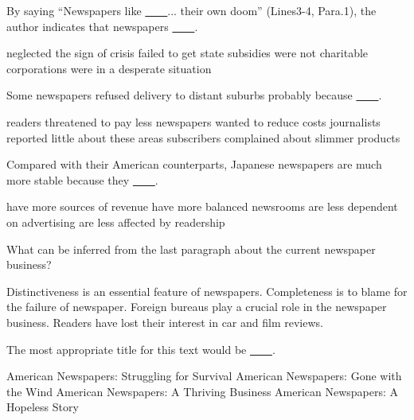 \item By saying ``Newspapers like \uline{~~~~}... their own doom'' (Lines3-4, Para.1), the author indicates that newspapers \uline{~~~~}.
\begin{tasks}
	\task neglected the sign of crisis
	\task failed to get state subsidies
	\task were not charitable corporations
	\task were in a desperate situation
\end{tasks}
\item Some newspapers refused delivery to distant suburbs probably because \uline{~~~~}.
\begin{tasks}
	\task readers threatened to pay less
	\task newspapers wanted to reduce costs
	\task journalists reported little about these areas
	\task subscribers complained about slimmer products
\end{tasks}
\item Compared with their American counterparts, Japanese newspapers are much more stable because they \uline{~~~~}.
\begin{tasks}
	\task have more sources of revenue
	\task have more balanced newsrooms
	\task are less dependent on advertising
	\task are less affected by readership
\end{tasks}
\item What can be inferred from the last paragraph about the current newspaper business?
\begin{tasks}
	\task Distinctiveness is an essential feature of newspapers.
	\task Completeness is to blame for the failure of newspaper.
	\task Foreign bureaus play a crucial role in the newspaper business.
	\task Readers have lost their interest in car and film reviews.
\end{tasks}
\item The most appropriate title for this text would be \uline{~~~~}.
\begin{tasks}
	\task American Newspapers: Struggling for Survival
	\task American Newspapers: Gone with the Wind
	\task American Newspapers: A Thriving Business
	\task American Newspapers: A Hopeless Story
\end{tasks}